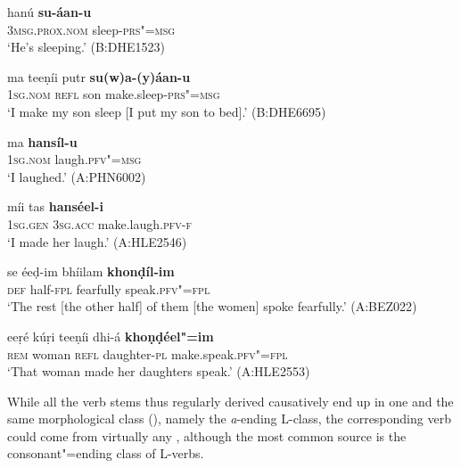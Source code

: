 \begin{exe}
\ex
\label{ex:8-7}
\gll hanú \textbf{su-áan-u} \\
\textsc{3msg.prox.nom} sleep-\textsc{prs"=msg} \\
\glt `He's sleeping.' (B:DHE1523)
\end{exe}
\begin{exe}
\ex
\label{ex:8-8}
\gll ma teeṇíi putr \textbf{su(w)a-(y)áan-u}  \\
\textsc{1sg.nom} \textsc{refl} son make.sleep-\textsc{prs"=msg} \\
\glt `I make my son sleep [I put my son to bed].' (B:DHE6695)
\end{exe}
\begin{exe}
\ex
\label{ex:8-9}
\gll ma \textbf{hansíl-u} \\
\textsc{1sg.nom} laugh.\textsc{pfv"=msg} \\
\glt `I laughed.' (A:PHN6002)
\end{exe}
\begin{exe}
\ex
\label{ex:8-10}
\gll míi tas \textbf{hanséel-i} \\
\textsc{1sg.gen} \textsc{3sg.acc} make.laugh.\textsc{pfv-f} \\
\glt `I made her laugh.' (A:HLE2546)
\end{exe}
\begin{exe}
\ex
\label{ex:8-11}
\gll se éeḍ-im bhíilam \textbf{khonḍíl-im} \\
\textsc{def} half-\textsc{fpl} fearfully speak.\textsc{pfv"=fpl} \\
\glt `The rest [the other half] of them [the women] spoke fearfully.' (A:BEZ022)
\end{exe}
\begin{exe}
\ex
\label{ex:8-12}
\gll eeṛé kúṛi teeṇíi dhi-á \textbf{khoṇḍéel"=im} \\
\textsc{rem} woman \textsc{refl} daughter-\textsc{pl} make.speak.\textsc{pfv"=fpl} \\
\glt `That woman made her daughters speak.' (A:HLE2553)
\end{exe}

While all the verb stems thus regularly derived causatively end up in one and the same morphological class (), namely the \textit{a}-ending L-class, the corresponding  verb could come from virtually any , although the most common source is the consonant"=ending class of L-verbs.


